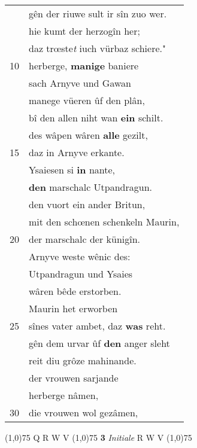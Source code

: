 \documentclass[8pt,a4paper,notitlepage]{article}
\begin{document}
\begin{table}[ht]
\begin{minipage}[t]{0.5\linewidth}
\begin{tabular}{rl}
 & gên der riuwe sult ir sîn zuo wer.\\ 
 & hie kumt der herzogîn her;\\ 
 & daz trœste\textit{t} iuch vürbaz schiere."\\ 
10 & herberge, \textbf{manige} baniere\\ 
 & sach Arnyve und Gawan\\ 
 & manege vüeren ûf den plân,\\ 
 & bî den allen niht wan \textbf{ein} schilt.\\ 
 & des wâpen wâren \textbf{alle} gezilt,\\ 
15 & daz in Arnyve erkante.\\ 
 & Ysaiesen si \textbf{in} nante,\\ 
 & \textbf{den} marschalc Utpandragun.\\ 
 & den vuort ein ander Britun,\\ 
 & mit den schœnen schenkeln Maurin,\\ 
20 & der marschalc der künigîn.\\ 
 & Arnyve weste wênic des:\\ 
 & Utpandragun und Ysaies\\ 
 & wâren bêde erstorben.\\ 
 & Maurin het erworben\\ 
25 & sînes vater ambet, daz \textbf{was} reht.\\ 
 & gên dem urvar ûf \textbf{den} anger sleht\\ 
 & reit diu grôze mahinande.\\ 
 & der vrouwen sarjande\\ 
 & herberge nâmen,\\ 
30 & die vrouwen wol gezâmen,\\ 
\end{tabular}
\scriptsize
\line(1,0){75} \newline
Q R W V \newline
\line(1,0){75} \newline
\textbf{3} \textit{Initiale} R W V  \newline
\line(1,0){75} \newline

\end{minipage}
\end{table}
\end{document}
